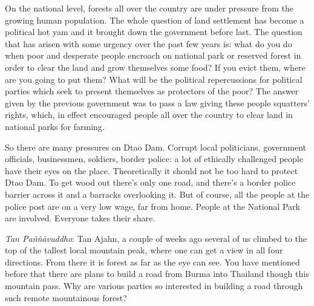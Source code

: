 On the national level, forests all over the country are under pressure
from the growing human population. The whole question of land settlement
has become a political hot yam and it brought down the government before
last. The question that has arisen with some urgency over the past few
years is: what do you do when poor and desperate people encroach on
national park or reserved forest in order to clear the land and grow
themselves some food? If you evict them, where are you going to put
them? What will be the political repercussions for political parties
which seek to present themselves as protectors of the poor? The answer
given by the previous government was to pass a law giving these people
squatters' rights, which, in effect encouraged people all over the
country to clear land in national parks for farming. 

So there are many pressures on Dtao Dam. Corrupt local politicians, 
government officials, businessmen, soldiers, border police: a lot of
ethically challenged people have their eyes on the place. Theoretically
it should not be too hard to protect Dtao Dam. To get wood out there's
only one road, and there's a border police barrier across it and a
barracks overlooking it. But of course, all the people at the police
post are on a very low wage, far from home. People at the National Park
are involved. Everyone takes their share. 

\emph{Tan Paññāvuddho}: Tan Ajahn, a couple of weeks ago several of us
climbed to the top of the tallest local mountain peak, where one can get
a view in all four directions. From there it is forest as far as the eye
can see. You have mentioned before that there are plans to build a road
from Burma into Thailand though this mountain pass. Why are various
parties so interested in building a road through such remote mountainous
forest? 

